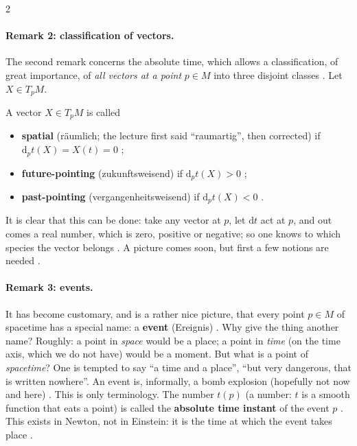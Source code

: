 \begin{paracol}{2}
\paragraph{Remark 2: classification of vectors.} The second remark concerns the absolute time, which allows a classification, of great importance, of \emph{all vectors at a point}
$p\in M$ into three disjoint classes . Let $X\in T_pM$.
\begin{definition}\label{def:nk-vectors}
A vector $X\in T_pM$ is called
\begin{itemize}
  \item \textbf{spatial} (r\"aumlich; the lecture first said ``raumartig'', then corrected) if $\mathrm d_pt(X)=X(t)=0$ ;
  \item \textbf{future-pointing} (zukunftsweisend) if $\mathrm d_pt(X)>0$ ;
  \item \textbf{past-pointing} (vergangenheitsweisend) if $\mathrm d_pt(X)<0$ .
\end{itemize}
\end{definition}
It is clear that this can be done: take any vector at $p$, let $\mathrm dt$ act at $p$, and out comes a real number, which is zero, positive or negative; so one knows to which species the vector
belongs . A picture comes soon, but first a few notions are needed .

\paragraph{Remark 3: events.} It has become customary, and is a rather nice picture, that every point $p\in M$ of spacetime has a special name: a \textbf{event} (Ereignis)
. Why give the thing another name? Roughly: a point in \emph{space} would be a place; a point in \emph{time} (on the time axis, which we do not have) would be a moment. But what is a point of
\emph{spacetime}? One is tempted to say ``a time and a place'', ``but very dangerous, that is written nowhere''. An event is, informally, a bomb explosion (hopefully not now and here)
. This is only terminology. The number $t(p)$ (a number: $t$ is a smooth function that eats a point) is called the \textbf{absolute time instant} of the event $p$
. This exists in Newton, not in Einstein: it is the time at which the event takes place .


\end{paracol}
